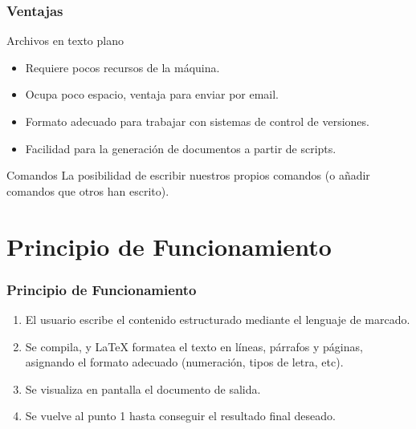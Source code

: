 \documentclass[aspectratio=43]{beamer}%
\begin{document}
\begin{frame}[fragile]
\frametitle{\textbf{Ventajas}}
\justifying
 \begin{block}{Archivos en texto plano}
\begin{itemize}\justifying
  \item Requiere pocos recursos de la máquina.
  \item Ocupa poco espacio, ventaja para enviar por email.
  \item Formato adecuado para trabajar con sistemas de control de versiones.
  \item Facilidad para la generación de documentos a partir de scripts.
\end{itemize}

\end{block}

\begin{block}{Comandos}
La posibilidad de escribir nuestros propios comandos (o añadir comandos que otros han escrito).
\end{block}


\end{frame}

\section{Principio de Funcionamiento}
\begin{frame}[fragile]
\frametitle{\textbf{Principio de Funcionamiento}}
\justifying
 \begin{enumerate}\justifying
  \item El usuario escribe el contenido estructurado mediante el lenguaje de marcado.
  \item Se compila, y \LaTeX{} formatea el texto en líneas, párrafos y páginas, asignando el formato adecuado (numeración, tipos de letra, etc).
  \item Se visualiza en pantalla el documento de salida.
  \item Se vuelve al punto 1 hasta conseguir el resultado final deseado.
\end{enumerate}

\end{frame}
\end{document}
